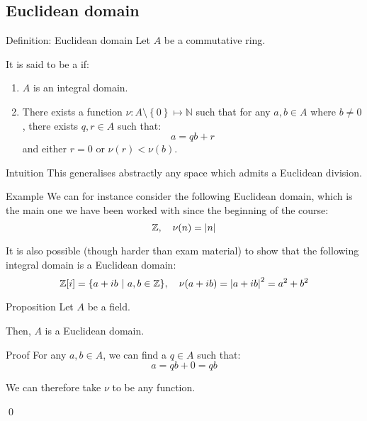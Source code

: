 \documentclass[a4paper]{article}
\begin{document}
\subsection{Euclidean domain}

\begin{parag}{Definition: Euclidean domain}
    Let $A$ be a commutative ring. 

    It is said to be a  if:
    \begin{enumerate}
        \item $A$ is an integral domain.
        \item There exists a function $\nu: A \setminus \left\{0\right\} \mapsto \mathbb{N}$ such that for any $a, b \in A$ where $b \neq 0$, there exists $q, r \in A$ such that: 
        \[a = qb + r\]
        and either $r = 0$ or $\nu\left(r\right) < \nu\left(b\right)$.
    \end{enumerate}

    \begin{subparag}{Intuition}
        This generalises abstractly any space which admits a Euclidean division.
    \end{subparag}

    \begin{subparag}{Example}
        We can for instance consider the following Euclidean domain, which is the main one we have been worked with since the beginning of the course:
        \[\mathbb{Z}, \mathspace \nu\left(n\right) = \left|n\right|\]

        It is also possible (though harder than exam material) to show that the following integral domain is a Euclidean domain: 
        \[\mathbb{Z}\left[i\right] = \left\{a + ib \suchthat a, b \in \mathbb{Z}\right\}, \mathspace \nu\left(a + ib\right) = \left|a + ib\right|^2 = a^2 + b^2\]
        
    \end{subparag}
\end{parag}

\begin{parag}{Proposition}
    Let $A$ be a field.

    Then, $A$ is a Euclidean domain.

    \begin{subparag}{Proof}
        For any $a, b \in A$, we can find a $q \in A$ such that: 
        \[a = qb + 0 = qb\]
        
        We can therefore take $\nu$ to be any function.

        \qed
    \end{subparag}
\end{parag}
\end{document}
